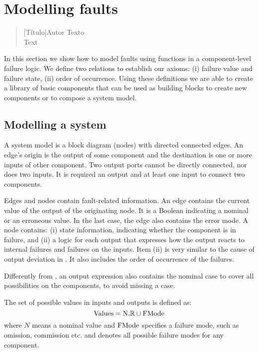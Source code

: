 \chapter{Modelling faults}
\label{sec:fault-modelling}

\begin{quotation}[Título]{Autor}
Texto \\
Text
\end{quotation}

In this section we show how to model faults using functions in a component-level failure logic.
%
We define two relations to establish our axioms: (i) failure value and failure state, (ii) order of occurrence.
%
Using these definitions we are able to create a library of basic components that can be used as building blocks to create new components or to compose a system model.

\section{Modelling a system}
\label{sec:modelling-a-system}

A system model is a block diagram (nodes) with directed connected edges. 
%
An edge's origin is the output of some component and the destination is one or more inputs of other component.
%
Two output ports cannot be directly connected, nor does two inputs.
%
It is required an output and at least one input to connect two components.

Edges and nodes contain fault-related information.
%
An edge contains the current value of the output of the originating node.
%
It is a Boolean indicating a nominal or an erroneous value. 
%
In the last case, the edge also contains the error mode.
%
A node contains: (i) state information, indicating whether the component is in failure, and (ii) a logic for each output that expresses how the output reacts to internal failures and failures on the inputs. 
%
Item (ii) is very similar to the cause of output deviation in .
%
It also includes the order of occurrence of the failures.

Differently from \HIPHOPS, an output expression also contains the nominal case to cover all possibilities on the components, to avoid missing a case.

\begin{definition}[Values]
The set of possible values in inputs and outputs is defined as: 
\[\mathrm{Values}=\mathrm{N}.\mathbb{R} \cup \mathrm{FMode}\]
%
where $N$ means a nominal value and $\mathrm{FMode}$ specifies a failure mode, such as omission, commission etc. and denotes all possible failure modes for any component.
\end{definition}

